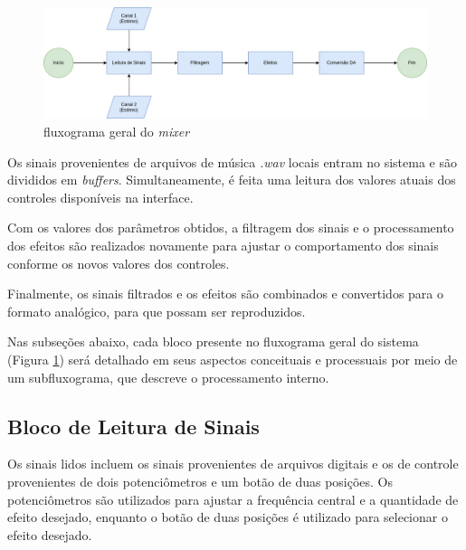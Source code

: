 \begin{figure}[h]
    \centering
    \includegraphics[width=\textwidth]{figuras/fig52.png}
    \caption{fluxograma geral do \textit{mixer}}
    \label{fig52}
\end{figure}

Os sinais provenientes de arquivos de música \textit{.wav} locais entram no sistema e são divididos em \textit{buffers}. Simultaneamente, é feita uma leitura dos valores atuais dos controles disponíveis na interface.

Com os valores dos parâmetros obtidos, a filtragem dos sinais e o processamento dos efeitos são realizados novamente para ajustar o comportamento dos sinais conforme os novos valores dos controles.

Finalmente, os sinais filtrados e os efeitos são combinados e convertidos para o formato analógico, para que possam ser reproduzidos.

Nas subseções abaixo, cada bloco presente no fluxograma geral do sistema (Figura \ref{fig52}) será detalhado em seus aspectos conceituais e processuais por meio de um subfluxograma, que descreve o processamento interno.

\subsection{Bloco de Leitura de Sinais}

Os sinais lidos incluem os sinais provenientes de arquivos digitais e os de controle provenientes de dois potenciômetros e um botão de duas posições. Os potenciômetros são utilizados para ajustar a frequência central e a quantidade de efeito desejado, enquanto o botão de duas posições é utilizado para selecionar o efeito desejado.

